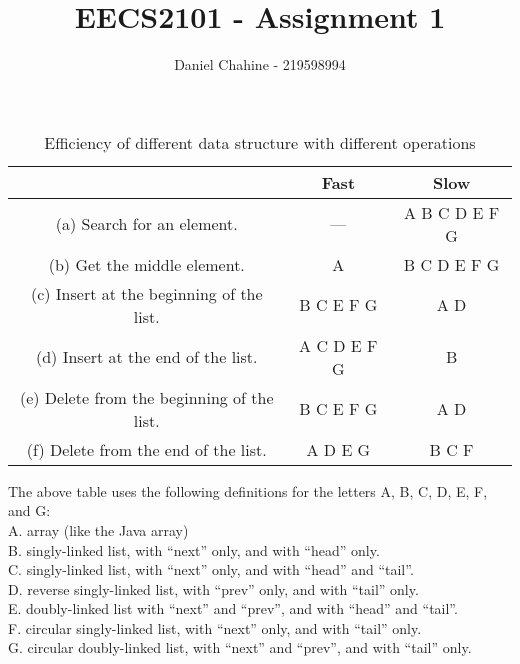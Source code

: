 \documentclass{article}
\title{EECS2101 - Assignment 1}
\author{Daniel Chahine - 219598994}
\begin{document}
\maketitle


\begin{table}[h!]
\setlength{\tabcolsep}{25pt}
\renewcommand{\arraystretch}{1.5}
\centering
\begin{tabular}{ ||c|c|c||  }
 \hline
  & \textbf{Fast} & \textbf{Slow}\\ 
 \hline
 (a) Search for an element. & --- & A B C D E F G   \\\hline 
 (b) Get the middle element. & A & B C D E F G  \\\hline
 (c) Insert at the beginning of the list. & B C E F G & A D\\\hline
 (d) Insert at the end of the list. & A C D E F G  &B \\\hline
 (e) Delete from the beginning of the list. & B C E F G & A D \\\hline 
 (f) Delete from the end of the list. & A D E G & B C F \\
 
\hline
\end{tabular}
\caption{Efficiency of different data structure with different operations}
\label{table:1}
\end{table}

The above table uses the following definitions for the letters A, B, C, D, E, F, and G:\\
A. array (like the Java array)\\
B. singly-linked list, with “next” only, and with “head” only.\\
C. singly-linked list, with “next” only, and with “head” and “tail”.\\
D. reverse singly-linked list, with “prev” only, and with “tail” only.\\
E. doubly-linked list with “next” and “prev”, and with “head” and “tail”.\\
F. circular singly-linked list, with “next” only, and with “tail” only.\\
G. circular doubly-linked list, with “next” and “prev”, and with “tail” only.\\
\end{document}
